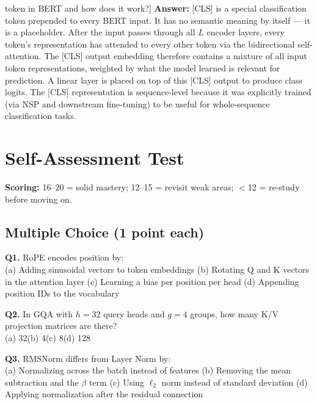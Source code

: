 \documentclass[11pt, a4paper]{article}
\begin{document}
\begin{notebox}[L1 --- What is the [CLS] token in BERT and how does it work?]
\textbf{Answer:} [CLS] is a special classification token prepended to every BERT input. It has no semantic meaning by itself --- it is a placeholder. After the input passes through all $L$ encoder layers, every token's representation has attended to every other token via the bidirectional self-attention. The [CLS] output embedding therefore contains a mixture of all input token representations, weighted by what the model learned is relevant for prediction. A linear layer is placed on top of this [CLS] output to produce class logits. The [CLS] representation is sequence-level because it was explicitly trained (via NSP and downstream fine-tuning) to be useful for whole-sequence classification tasks.
\end{notebox}

\newpage
\section{Self-Assessment Test}

\textbf{Scoring:} 16--20 = solid mastery; 12--15 = revisit weak areas; $<$12 = re-study before moving on.

\subsection*{Multiple Choice (1 point each)}

\textbf{Q1.} RoPE encodes position by:\\
(a) Adding sinusoidal vectors to token embeddings\quad
(b) Rotating Q and K vectors in the attention layer\quad
(c) Learning a bias per position per head\quad
(d) Appending position IDs to the vocabulary

\textbf{Q2.} In GQA with $h=32$ query heads and $g=4$ groups, how many K/V projection matrices are there?\\
(a) 32\quad (b) 4\quad (c) 8\quad (d) 128

\textbf{Q3.} RMSNorm differs from Layer Norm by:\\
(a) Normalizing across the batch instead of features\quad
(b) Removing the mean subtraction and the $\beta$ term\quad
(c) Using $\ell_2$ norm instead of standard deviation\quad
(d) Applying normalization after the residual connection
\end{document}
